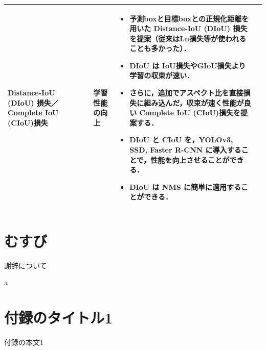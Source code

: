 \documentclass[originalpaper]{jsaiart}     %
\begin{document}
\begin{table}
\begin{center}
\begin{tabularx}{\linewidth}{Xp{1.5cm}Xp{7cm}X}
            Distance-IoU (DIoU) 損失／Complete IoU (CIoU)損失
            & \cite{ZWLLYR20} & 学習性能の向上 & 
            \begin{itemize}
                \vspace{-0.7\baselineskip}
                \setlength{\leftskip}{-3mm}
                \item 予測boxと目標boxとの正規化距離を用いた Distance-IoU (DIoU) 損失を提案（従来はLn損失等が使われることも多かった）．
                \item DIoU は IoU損失やGIoU損失より学習の収束が速い．
                \item さらに，追加でアスペクト比を直接損失に組み込んだ，収束が速く性能が良い Complete IoU (CIoU)損失を提案する．
                \item DIoU と CIoU を，YOLOv3, SSD, Faster R-CNN に導入することで，性能を向上させることができる．
                \item DIoU は NMS に簡単に適用することができる．
            \end{itemize}
            &
            \\
            \bottomrule
        \end{tabularx}
    \end{center}
\end{table}%

\section{むすび}

\begin{acknowledgment}
謝辞について
\end{acknowledgment}a

%



\appendix

\section{付録のタイトル1}
付録の本文1

\begin{biography}
\end{biography}
\end{document}
